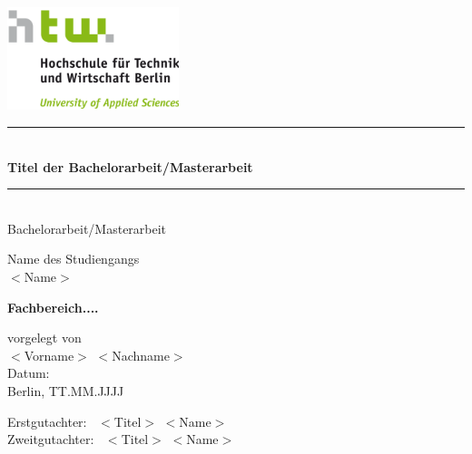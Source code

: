 \begin{center}
    \includegraphics[width=5cm, height=3cm]{images/htw_hochschule.png}
    
    \vspace*{0.7cm}
    
    \rule{\linewidth}{0.1 mm} \\[1 cm]
    
     {\LARGE \textbf{\textcolor[HTML]{70AD47} {Titel der Bachelorarbeit/Masterarbeit}}} \\ [0.5cm]
     
    \rule{\linewidth}{0.1 mm} \\[0.7 cm]
    
    {\Large Bachelorarbeit/Masterarbeit} 
    
    \vspace*{2.0cm}
    
    {\normalsize Name des Studiengangs} \\ \vspace{0.5cm} 
    {\LARGE $<$Name$>$}\\
    \vspace*{1cm}
    
    {\LARGE \textbf{\textcolor[HTML]{70AD47}{Fachbereich....}}}\\
    
    \vspace*{0.5cm}
    
    {\normalsize vorgelegt von} \\ \vspace{0.5cm}
    {\LARGE $<$Vorname$>$ $<$Nachname$>$}\\
    
    \vspace*{2cm}
    {\normalsize Datum:}\\ \vspace{0.3cm}
    {\large Berlin, TT.MM.JJJJ}\\
    
\end{center}
\vspace*{1.0cm}

\begin{center}
    {\LARGE Erstgutachter: \, }
    {\LARGE $<$Titel$>$ $<$Name$>$}\\[0.5cm]
    {\LARGE Zweitgutachter: \, }
    {\LARGE $<$Titel$>$ $<$Name$>$}
\end{center}